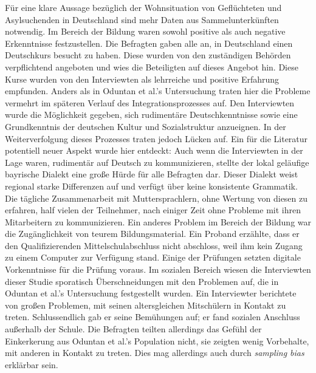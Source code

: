 Für eine klare Aussage bezüglich der Wohnsituation von Geflüchteten und Asylsuchenden in Deutschland sind mehr Daten aus Sammelunterkünften notwendig.\newline 
Im Bereich der Bildung waren sowohl positive als auch negative Erkenntnisse festzustellen. Die Befragten gaben alle an, in Deutschland einen Deutschkurs besucht zu haben. Diese wurden von den zuständigen Behörden verpflichtend angeboten und wies die Beteiligten auf dieses Angebot hin.\newline
Diese Kurse wurden von den Interviewten als lehrreiche und positive Erfahrung empfunden.\newline
Anders als in Oduntan et al.'s Untersuchung traten hier die Probleme vermehrt im späteren Verlauf des Integrationsprozesses auf. Den Interviewten wurde die Möglichkeit gegeben, sich rudimentäre Deutschkenntnisse sowie eine Grundkenntnis der deutschen Kultur und Sozialstruktur anzueignen.\newline
In der Weiterverfolgung dieses Prozesses traten jedoch Lücken auf.\newline
Ein für die Literatur potentiell neuer Aspekt wurde hier entdeckt: Auch wenn die Interviewten in der Lage waren, rudimentär auf Deutsch zu kommunizieren, stellte der lokal geläufige bayrische Dialekt eine große Hürde für alle Befragten dar. Dieser Dialekt weist regional starke Differenzen auf und verfügt über keine konsistente Grammatik.\newline
Die tägliche Zusammenarbeit mit Muttersprachlern, ohne Wertung von diesen zu erfahren, half vielen der Teilnehmer, nach einiger Zeit ohne Probleme mit ihren Mitarbeitern zu kommunizieren.\newline
Ein anderes Problem im Bereich der Bildung war die Zugänglichkeit von teurem Bildungsmaterial. Ein Proband erzählte, dass er den Qualifizierenden Mittelschulabschluss nicht abschloss, weil ihm kein Zugang zu einem Computer zur Verfügung stand. Einige der Prüfungen setzten digitale Vorkenntnisse für die Prüfung voraus.\newline
Im sozialen Bereich wiesen die Interviewten dieser Studie sporatisch Überschneidungen mit den Problemen auf, die in Oduntan et al.'s Untersuchung festgestellt wurden. Ein Interviewter berichtete von großen Problemen, mit seinen altersgleichen Mitschülern in Kontakt zu treten. Schlussendlich gab er seine Bemühungen auf; er fand sozialen Anschluss außerhalb der Schule.\newline
Die Befragten teilten allerdings das Gefühl der Einkerkerung aus Oduntan et al.'s Population nicht, sie zeigten wenig Vorbehalte, mit anderen in Kontakt zu treten. Dies mag allerdings auch durch \textit{sampling bias} erklärbar sein.\newline
